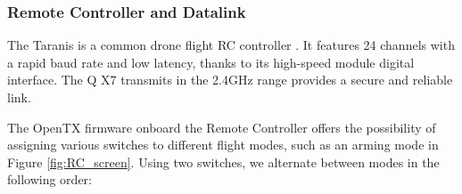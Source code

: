 \subsubsection{Remote Controller and Datalink}

The Taranis is a common drone flight RC controller \cite{px4_docs}. It features 24 channels with a rapid baud rate and low latency, thanks to its high-speed module digital interface. The Q X7 transmits in the 2.4GHz range provides a secure and reliable link. 

The OpenTX firmware \cite{px4_docs} onboard the Remote Controller offers the possibility of assigning various switches to different flight modes, such as an arming mode in Figure \ref{fig:RC_screen}. Using two switches, we alternate between modes in the following order:

\begin{figure}[!h]
    \raggedright
    \begin{minipage}{1.0\textwidth}
    \centering
    \hspace{0.5cm}
    \hspace{0.5cm}
    \hspace{0.5cm}\\
    \hspace{0.5cm}

\end{minipage}
\end{figure}
